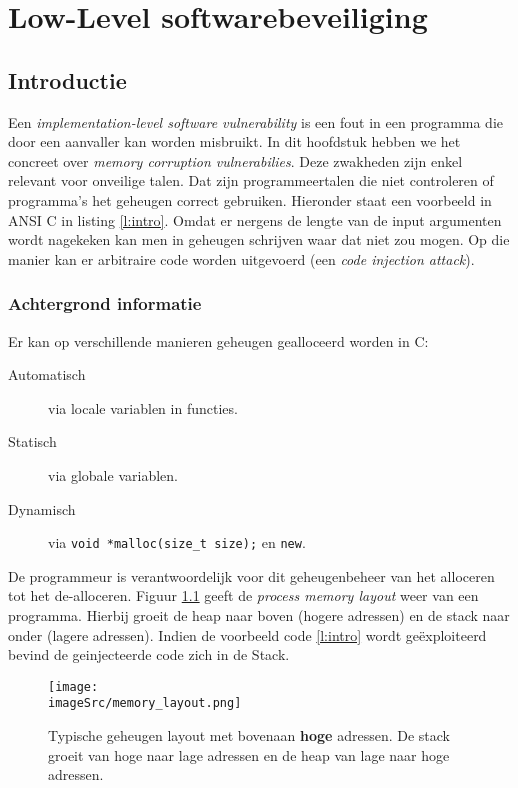 \documentclass[../main.tex]{subfiles}
\begin{document}
\chapter{Low-Level softwarebeveiliging}
\section{Introductie}
Een \emph{implementation-level software vulnerability} is een fout in een programma die door een aanvaller kan worden misbruikt.
In dit hoofdstuk hebben we het concreet over \emph{memory corruption vulnerabilies}.
Deze zwakheden zijn enkel relevant voor onveilige talen.
Dat zijn programmeertalen die niet controleren of programma's het geheugen correct gebruiken.
Hieronder staat een voorbeeld in ANSI C in listing \ref{l:intro}. Omdat er nergens de lengte van de input argumenten wordt nagekeken kan men in geheugen schrijven waar dat niet zou mogen.
Op die manier kan er arbitraire code worden uitgevoerd (een \emph{code injection attack}).



\subsection{Achtergrond informatie}
Er kan op verschillende manieren geheugen gealloceerd worden in C:
\begin{description}
	\item[Automatisch] via locale variablen in functies.
	\item[Statisch] via globale variablen.
	\item[Dynamisch] via \lstinline[style=cstyle]{void *malloc(size_t size);} en \lstinline[style=cstyle]{new}.
\end{description}
De programmeur is verantwoordelijk voor dit geheugenbeheer van het alloceren tot het de-alloceren.
Figuur \ref{f:mem_lay} geeft de \emph{process memory layout} weer van een programma.
Hierbij groeit de heap naar boven (hogere adressen) en de stack naar onder (lagere adressen).
Indien de voorbeeld code \ref{l:intro} wordt ge\"exploiteerd bevind de geinjecteerde code zich in de Stack.
\begin{figure}
\centering
\texttt{[image: \\imageSrc/memory\_layout.png]}
\caption{Typische geheugen layout met bovenaan \textbf{hoge} adressen. De stack groeit van hoge naar lage adressen en de heap van lage naar hoge adressen.}
\label{f:mem_lay}
\end{figure}
\end{document}
